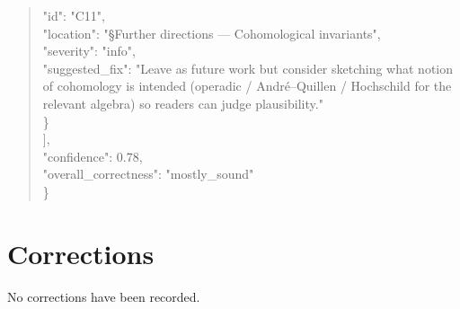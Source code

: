 \documentclass[11pt]{article}
\begin{document}
\begin{quote}
      "id": "C11",\\
      "location": "§Further directions --- Cohomological invariants",\\
      "severity": "info",\\
      "suggested\_fix": "Leave as future work but consider sketching what notion of cohomology is intended (operadic / André--Quillen / Hochschild for the relevant algebra) so readers can judge plausibility."\\
    \}\\
  ],\\
  "confidence": 0.78,\\
  "overall\_correctness": "mostly\_sound"\\
\}\\
\end{quote}

\section*{Corrections}
No corrections have been recorded.
\end{document}
